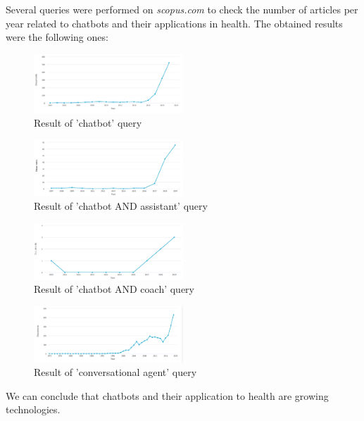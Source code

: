 \documentclass[12pt,english]{article}
\begin{document}
Several queries were performed on \textit{scopus.com} to check the number of articles per year related to chatbots and their applications in health. The obtained results were the following ones:

\begin{figure}[H]
  \centering
  \includegraphics[width=0.5\textwidth]{chatbot.png}
  \caption{Result of 'chatbot' query}
\end{figure}


\begin{figure}[H]
  \centering
  \includegraphics[width=0.5\textwidth]{chatbotandassistant.png}
  \caption{Result of 'chatbot AND assistant' query}
\end{figure}


\begin{figure}[H]
  \centering
  \includegraphics[width=0.5\textwidth]{chatbotandcoach.png}
  \caption{Result of 'chatbot AND coach' query}
\end{figure}


\begin{figure}[H]
  \centering
  \includegraphics[width=0.5\textwidth]{conversationalagent.png}
  \caption{Result of 'conversational agent' query}
\end{figure}

We can conclude that chatbots and their application to health are growing technologies.
\end{document}
